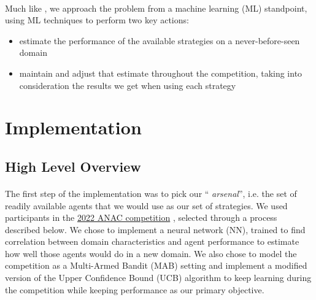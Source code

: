 \documentclass[12pt]{article}
\numberwithin{equation}{section}
\newcommand{\quotes}[1]{\textquotedblleft{} #1\textquotedblright}
\begin{document}
		\paragraph*{}
			Much like \cite{meta_agent_paper}, we approach the problem from a machine learning (ML) standpoint, using ML techniques to perform two key actions:
			\begin{itemize}
				\item estimate the performance of the available strategies on a never-before-seen domain
				\item maintain and adjust that estimate throughout the competition, taking into consideration the results we get when using each strategy
			\end{itemize}

	\section{Implementation}		\label{sec:implementation}

		\subsection{High Level Overview}	\label{sec:implementation.high_level_view}

			\paragraph*{}
				The first step of the implementation was to pick our \quotes{\emph{arsenal}}, i.e. the set of readily available agents that we would use as our set of strategies. We used participants in the \href{https://web.tuat.ac.jp/~katfuji/ANAC2022/}{2022 ANAC competition} \cite{ANAC}, selected through a process described below. We chose to implement a neural network (NN), trained to find correlation between domain characteristics and agent performance to estimate how well those agents would do in a new domain. We also chose to model the competition as a Multi-Armed Bandit (MAB) %
				setting and implement a modified version of the Upper Confidence Bound (UCB) algorithm to keep learning during the competition while keeping performance as our primary objective.
\end{document}
